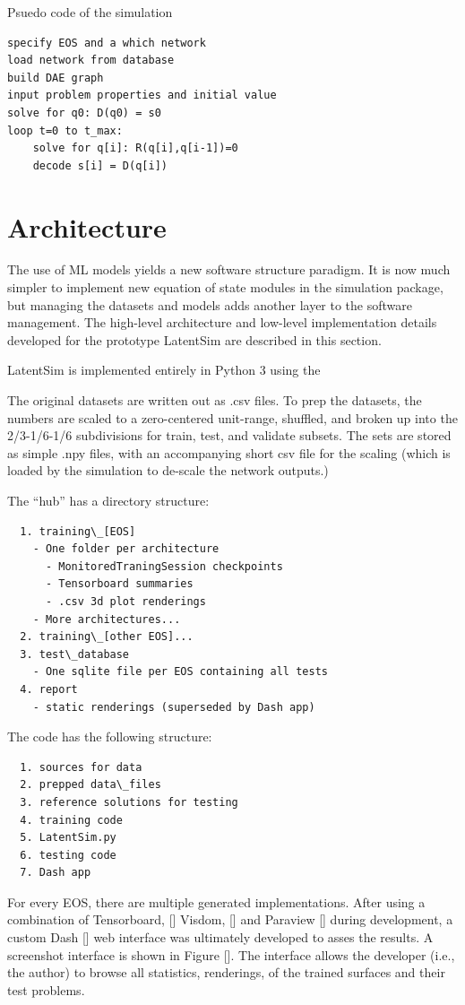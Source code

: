 \documentclass[]{article}
\begin{document}
\begin{algorithm}
  \caption{Psuedo code of the simulation}
\begin{verbatim}
specify EOS and a which network
load network from database
build DAE graph
input problem properties and initial value
solve for q0: D(q0) = s0
loop t=0 to t_max:
    solve for q[i]: R(q[i],q[i-1])=0
    decode s[i] = D(q[i])
\end{verbatim}
  \end{algorithm}

\hypertarget{header-n3356}{%
\section{Architecture}\label{header-n3356}}

The use of ML models yields a new software structure paradigm. It is now much simpler to implement new equation of state modules in
the simulation package, but managing the datasets and models adds
another layer to the software management. The high-level architecture
and low-level implementation details developed for the prototype
LatentSim are described in this section.

LatentSim is implemented entirely in Python 3 using the 

The original datasets are written out as .csv files. To prep the
datasets, the numbers are scaled to a zero-centered unit-range, shuffled, and broken up into the
2/3-1/6-1/6 subdivisions for train, test, and validate subsets. The
sets are stored as simple .npy files, with an accompanying short csv file
for the scaling (which is loaded by the simulation to de-scale the
network outputs.)


The ``hub'' has a directory structure:
\begin{verbatim}
  1. training\_[EOS]
    - One folder per architecture
      - MonitoredTraningSession checkpoints
      - Tensorboard summaries
      - .csv 3d plot renderings
    - More architectures...
  2. training\_[other EOS]...
  3. test\_database
    - One sqlite file per EOS containing all tests
  4. report
    - static renderings (superseded by Dash app)
\end{verbatim}
The code has the following structure:
\begin{verbatim}
  1. sources for data
  2. prepped data\_files
  3. reference solutions for testing
  4. training code
  5. LatentSim.py
  6. testing code
  7. Dash app
\end{verbatim}
For every EOS, there are multiple generated implementations.
After using a combination of Tensorboard, [] Visdom, [] and Paraview [] during
development, a custom Dash [] web interface was ultimately developed
to asses the results. A screenshot interface is shown in Figure []. The
interface allows the developer (i.e., the author) to browse all
statistics, renderings, of the trained surfaces and their test
problems.
\end{document}
